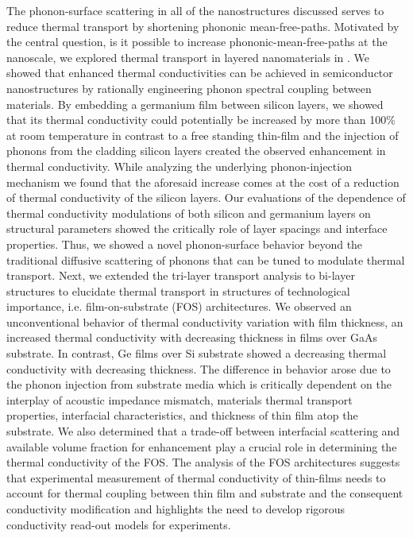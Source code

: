 \par The phonon-surface scattering in all of the nanostructures discussed serves to reduce thermal transport by shortening phononic mean-free-paths. Motivated by the central question, is it possible to increase phononic-mean-free-paths at the nanoscale, we explored thermal transport in layered nanomaterials in . We showed that enhanced thermal conductivities can be achieved in semiconductor nanostructures by rationally engineering phonon spectral coupling between materials. By embedding a germanium film between silicon layers, we showed that its thermal conductivity could potentially be increased by more than 100\% at room temperature in contrast to a free standing thin-film and the injection of phonons from the cladding silicon layers created the observed enhancement in thermal conductivity. While analyzing the underlying phonon-injection mechanism we found that the aforesaid increase comes at the cost of a reduction of thermal conductivity of the silicon layers. Our evaluations of the dependence of thermal conductivity modulations of both silicon and germanium layers on structural parameters showed the critically role of layer spacings and interface properties. Thus, we showed a novel phonon-surface behavior beyond the traditional diffusive scattering of phonons that can be tuned to modulate thermal transport. Next, we extended the tri-layer transport analysis to bi-layer structures to elucidate thermal transport in structures of technological importance, i.e. film-on-substrate (FOS) architectures. We observed an unconventional behavior of thermal conductivity variation with film thickness, an increased thermal conductivity with decreasing thickness in  films over GaAs substrate. In contrast, Ge films over Si substrate showed a decreasing thermal conductivity with decreasing thickness. The difference in behavior arose due to the phonon injection from substrate media which is critically dependent on the interplay of acoustic impedance mismatch, materials thermal transport properties, interfacial characteristics, and thickness of thin film atop the substrate. We also determined that a trade-off between interfacial scattering and available volume fraction for enhancement play a crucial role in determining the thermal conductivity of the FOS. The analysis of the FOS architectures suggests that experimental measurement of thermal conductivity of thin-films needs to account for thermal coupling between thin film and substrate and the consequent conductivity modification and highlights the need to develop rigorous conductivity read-out models for experiments.

